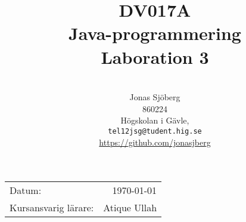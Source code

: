 \documentclass[11pt,a4paper]{article}
\title{DV017A \\ Java-programmering \\ Laboration 3}
\author{\\
  Jonas Sjöberg\\
  860224\\
  Högskolan i Gävle,\\
  \texttt{tel12jsg@tudent.hig.se}\\
  \url{https://github.com/jonasjberg}
}
\begin{document}
    \maketitle

    \begin{center}
    \begin{tabular}{l r}
        Datum: & \today \par \\
        Kursansvarig lärare: & Atique Ullah
    \end{tabular}
    \end{center}

    \begin{abstract}
    \end{abstract}

    \newpage
    \setcounter{tocdepth}{3}
    \tableofcontents
    \listoffigures
    \newpage

    
    
    
    
    
    
\end{document}
